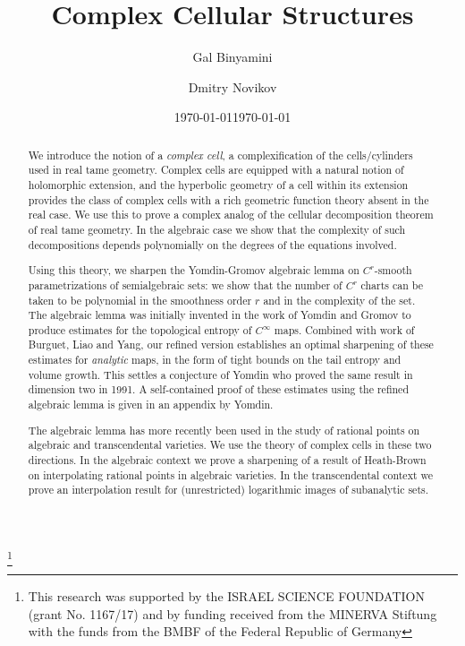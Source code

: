 \documentclass[reqno]{amsart}
\renewcommand\~[1]{\widetilde{#1}}
\begin{document}
\title{Complex Cellular Structures}

\author{Gal Binyamini}
\address{Weizmann Institute of Science, Rehovot, Israel}
\thanks{This research was supported by the ISRAEL SCIENCE FOUNDATION
  (grant No. 1167/17) and by funding received from the MINERVA
  Stiftung with the funds from the BMBF of the Federal Republic of
  Germany}

\author{Dmitry Novikov}
\address{Weizmann Institute of Science, Rehovot, Israel}


\date{\today}

\begin{abstract}
  We introduce the notion of a \emph{complex cell}, a complexification
  of the cells/cylinders used in real tame geometry. Complex cells are
  equipped with a natural notion of holomorphic extension, and the
  hyperbolic geometry of a cell within its extension provides the
  class of complex cells with a rich geometric function theory absent
  in the real case. We use this to prove a complex analog of the
  cellular decomposition theorem of real tame geometry. In the
  algebraic case we show that the complexity of such decompositions
  depends polynomially on the degrees of the equations involved.

  Using this theory, we sharpen the Yomdin-Gromov algebraic lemma on
  $C^r$-smooth parametrizations of semialgebraic sets: we show that
  the number of $C^r$ charts can be taken to be polynomial in the
  smoothness order $r$ and in the complexity of the set. The algebraic
  lemma was initially invented in the work of Yomdin and Gromov to
  produce estimates for the topological entropy of $C^\infty$
  maps. Combined with work of Burguet, Liao and Yang, our refined
  version establishes an optimal sharpening of these estimates for
  \emph{analytic} maps, in the form of tight bounds on the tail
  entropy and volume growth. This settles a conjecture of Yomdin who
  proved the same result in dimension two in 1991. A self-contained
  proof of these estimates using the refined algebraic lemma is given
  in an appendix by Yomdin.

  The algebraic lemma has more recently been used in the study of
  rational points on algebraic and transcendental varieties. We use
  the theory of complex cells in these two directions. In the
  algebraic context we prove a sharpening of a result of Heath-Brown
  on interpolating rational points in algebraic varieties. In the
  transcendental context we prove an interpolation result for
  (unrestricted) logarithmic images of subanalytic sets.
\end{abstract}
\maketitle
\date{\today}
\end{document}
